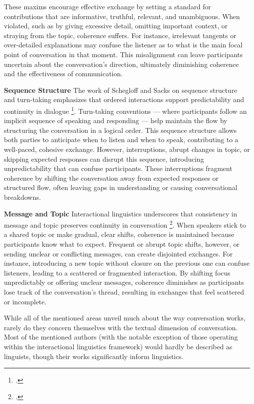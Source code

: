 \documentclass[12pt]{report}
\begin{document}
{These maxims encourage effective exchange by setting a standard for contributions that are informative, truthful, relevant, and unambiguous. When violated, such as by giving excessive detail, omitting important context, or straying from the topic, coherence suffers. For instance, irrelevant tangents or over-detailed explanations may confuse the listener as to what is the main focal point of conversation in that moment. This misalignment can leave participants uncertain about the conversation’s direction, ultimately diminishing coherence and the effectiveness of communication.

\par{\textbf{Sequence Structure}}
The work of Schegloff and Sacks on sequence structure and turn-taking emphasizes that ordered interactions support predictability and continuity in dialogue \footcite{Schegloff_2007}. Turn-taking conventions — where participants follow an implicit sequence of speaking and responding — help maintain the flow by structuring the conversation in a logical order. This sequence structure allows both parties to anticipate when to listen and when to speak, contributing to a well-paced, cohesive exchange. However, interruptions, abrupt changes in topic, or skipping expected responses can disrupt this sequence, introducing unpredictability that can confuse participants. These interruptions fragment coherence by shifting the conversation away from expected responses or structured flow, often leaving gaps in understanding or causing conversational breakdowns.

\par{\textbf{Message and Topic}}
Interactional linguistics underscores that consistency in message and topic preserves continuity in conversation
\footcite{CouperKuhlenSelting2017}. When speakers stick to a shared topic or make gradual, clear shifts, coherence is maintained because participants know what to expect. Frequent or abrupt topic shifts, however, or sending unclear or conflicting messages, can create disjointed exchanges. For instance, introducing a new topic without closure on the previous one can confuse listeners, leading to a scattered or fragmented interaction. By shifting focus unpredictably or offering unclear messages, coherence diminishes as participants lose track of the conversation’s thread, resulting in exchanges that feel scattered or incomplete.

\par
While all of the mentioned areas unveil much about the way conversation works,
rarely do they concern themselves with the textual dimension of conversation.
Most of the mentioned authors (with the notable exception of those operating within the interactional linguistics framework) would hardly be described as linguists,
though their works significantly inform linguistics.

}
\end{document}
